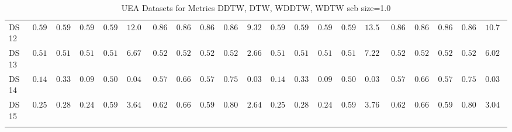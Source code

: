 {\begin{longtable}{|l|ccccc|ccccc|ccccc|ccccc|}
		DS 12 & $0.5957$ & $0.5955$ & $0.5954$ & $0.5955$ & $12.0573$ & $0.8652$ & $0.8638$ & $0.8646$ & $0.8638$ & $\boldsymbol{9.3214}$ & $0.5957$ & $0.5955$ & $0.5954$ & $0.5955$ & $13.5800$ & $\boldsymbol{0.8652}$ & $\boldsymbol{0.8638}$ & $\boldsymbol{0.8646}$ & $\boldsymbol{0.8638}$ & $10.7860$ \\
		DS 13 & $0.5158$ & $0.5154$ & $0.5144$ & $0.5154$ & $6.6752$ & $0.5263$ & $0.5271$ & $0.5255$ & $0.5271$ & $\boldsymbol{2.6654}$ & $0.5158$ & $0.5154$ & $0.5144$ & $0.5154$ & $7.2294$ & $\boldsymbol{0.5263}$ & $0.5271$ & $0.5255$ & $0.5271$ & $6.0250$ \\
		DS 14 & $0.1429$ & $0.3333$ & $0.0952$ & $0.5000$ & $0.0401$ & $0.5714$ & $0.6667$ & $0.5794$ & $0.7500$ & $\boldsymbol{0.0302}$ & $0.1429$ & $0.3333$ & $0.0952$ & $0.5000$ & $0.0390$ & $\boldsymbol{0.5714}$ & $\boldsymbol{0.6667}$ & $\boldsymbol{0.5794}$ & $\boldsymbol{0.7500}$ & $0.0351$ \\
		DS 15 & $0.2545$ & $0.2881$ & $0.2499$ & $0.5932$ & $3.6428$ & $0.6273$ & $0.6635$ & $0.5951$ & $0.8077$ & $\boldsymbol{2.6414}$ & $0.2545$ & $0.2881$ & $0.2499$ & $0.5932$ & $3.7697$ & $0.6273$ & $0.6635$ & $0.5951$ & $0.8077$ & $3.0406$ \\
		\hline
		\caption{UEA Datasets for Metrics DDTW, DTW, WDDTW, WDTW \gls{scb} size=1.0}
		\label{tab:UEA_ddtw-dtw-wddtw-wdtw_scb_size=1.0}
	\end{longtable}
}
